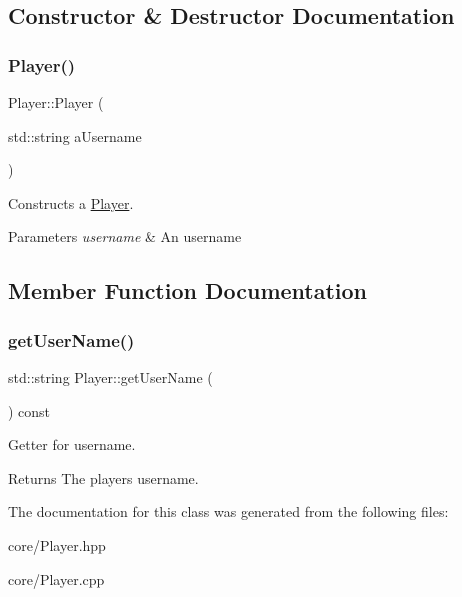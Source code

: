 \subsection{Constructor \& Destructor Documentation}
\mbox{\label{class_player_a71fac0ea4a91136e15d0c6e97ec1c7f5}} 
\subsubsection{\texorpdfstring{Player()}{Player()}}
{\footnotesize\ttfamily Player\+::\+Player (\begin{DoxyParamCaption}\item[{std\+::string}]{a\+Username }\end{DoxyParamCaption})}



Constructs a \hyperlink{class_player}{Player}. 


\begin{DoxyParams}{Parameters}
{\em username} & An username \\
\hline
\end{DoxyParams}


\subsection{Member Function Documentation}
\mbox{\label{class_player_a67ad1224529fafaa55fa35bcec72c211}} 
\subsubsection{\texorpdfstring{get\+User\+Name()}{getUserName()}}
{\footnotesize\ttfamily std\+::string Player\+::get\+User\+Name (\begin{DoxyParamCaption}{ }\end{DoxyParamCaption}) const\hspace{0.3cm}{\ttfamily [inline]}}



Getter for username. 

\begin{DoxyReturn}{Returns}
The player\textquotesingle{}s username. 
\end{DoxyReturn}


The documentation for this class was generated from the following files\+:\begin{DoxyCompactItemize}
\item 
core/Player.\+hpp\item 
core/Player.\+cpp\end{DoxyCompactItemize}
